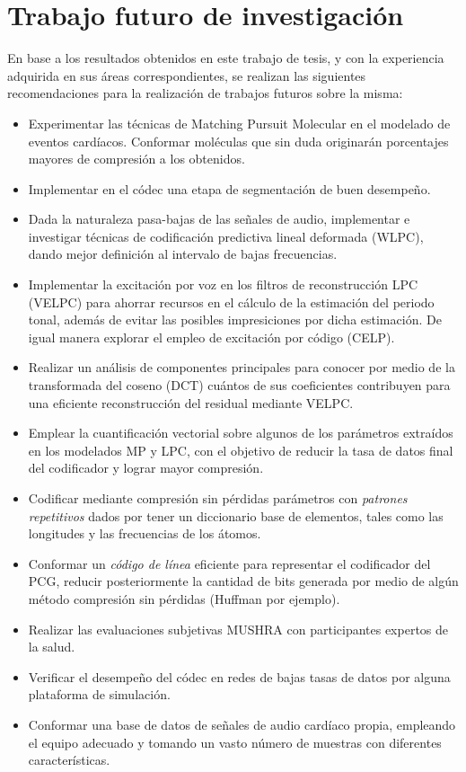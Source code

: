 \section{Trabajo futuro de investigación}
En base a los resultados obtenidos en este trabajo de tesis, y con la experiencia adquirida en sus áreas correspondientes, se realizan las siguientes recomendaciones para la realización de trabajos futuros sobre la misma:
\begin{itemize}
	\item Experimentar las técnicas de Matching Pursuit Molecular en el modelado de eventos cardíacos. Conformar moléculas que sin duda 			originarán porcentajes mayores de compresión a los obtenidos.
	\item Implementar en el códec una etapa de segmentación de buen desempeño.
	\item Dada la naturaleza pasa-bajas de las señales de audio, implementar e investigar técnicas de codificación predictiva lineal deformada 		(WLPC), dando mejor definición al intervalo de bajas frecuencias.
	\item Implementar la excitación por voz en los filtros de reconstrucción LPC (VELPC) para ahorrar recursos en el cálculo de la estimación 			del periodo tonal, además de evitar las posibles impresiciones por dicha estimación. De igual manera explorar el empleo de excitación por código (CELP).
	\item Realizar un análisis de componentes principales para conocer por medio de la transformada del coseno (DCT) cuántos de sus 			coeficientes contribuyen para una eficiente reconstrucción del residual mediante VELPC.
	\item Emplear la cuantificación vectorial sobre algunos de los parámetros extraídos en los modelados MP y LPC, con el objetivo de reducir 		la tasa de datos final del codificador y lograr mayor compresión.
	\item Codificar mediante compresión sin pérdidas parámetros con \emph{patrones repetitivos} dados por tener un diccionario base de 			elementos, tales como las longitudes y las frecuencias de los átomos.
	\item Conformar un \emph{código de línea} eficiente para representar el codificador del PCG, reducir posteriormente la cantidad de bits 			generada por medio de algún método compresión sin pérdidas (Huffman por ejemplo).
	\item Realizar las evaluaciones subjetivas MUSHRA con participantes expertos de la salud.
	\item Verificar el desempeño del códec en redes de bajas tasas de datos por alguna plataforma de simulación.
	\item Conformar una base de datos de señales de audio cardíaco propia, empleando el equipo adecuado y tomando un vasto número de 		muestras con diferentes características.
\end{itemize}



